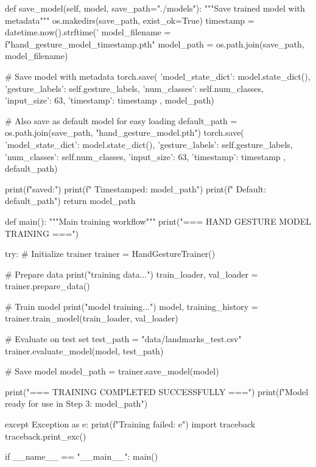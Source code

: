 \begin{aivncodebox}
\begin{python}
    def save_model(self, model, save_path="./models"):
        """Save trained model with metadata"""
        os.makedirs(save_path, exist_ok=True)
        timestamp = datetime.now().strftime('%
        model_filename = f"hand_gesture_model_{timestamp}.pth"
        model_path = os.path.join(save_path, model_filename)
        
        # Save model with metadata
        torch.save({
            'model_state_dict': model.state_dict(),
            'gesture_labels': self.gesture_labels,
            'num_classes': self.num_classes,
            'input_size': 63,
            'timestamp': timestamp
        }, model_path)
        
        # Also save as default model for easy loading
        default_path = os.path.join(save_path, "hand_gesture_model.pth")
        torch.save({
            'model_state_dict': model.state_dict(),
            'gesture_labels': self.gesture_labels,
            'num_classes': self.num_classes,
            'input_size': 63,
            'timestamp': timestamp
        }, default_path)
        
        print(f"\nModel saved:")
        print(f"  Timestamped: {model_path}")
        print(f"  Default:     {default_path}")
        return model_path

def main():
    """Main training workflow"""
    print("=== HAND GESTURE MODEL TRAINING ===")
    
    try:
        # Initialize trainer
        trainer = HandGestureTrainer()
        
        # Prepare data
        print("\nPreparing training data...")
        train_loader, val_loader = trainer.prepare_data()
        
        # Train model
        print("\nStarting model training...")
        model, training_history = trainer.train_model(train_loader, val_loader)
        
        # Evaluate on test set
        test_path = "data/landmarks_test.csv"
        trainer.evaluate_model(model, test_path)
        
        # Save model
        model_path = trainer.save_model(model)
        
        print("\n=== TRAINING COMPLETED SUCCESSFULLY ===")
        print(f"Model ready for use in Step 3: {model_path}")
        
    except Exception as e:
        print(f"Training failed: {e}")
        import traceback
        traceback.print_exc()

if __name__ == "__main__":
    main()
\end{python}
\end{aivncodebox}

